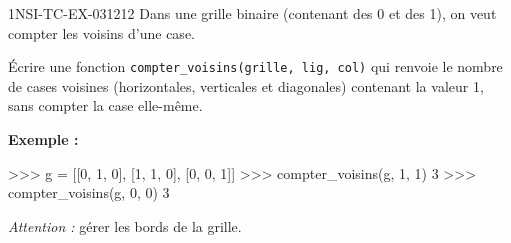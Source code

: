 \begin{exercice}{1NSI-TC-EX-031}{2}{12}
Dans une grille binaire (contenant des 0 et des 1), on veut compter les voisins
d'une case.

Écrire une fonction \lstinline{compter_voisins(grille, lig, col)} qui renvoie le
nombre de cases voisines (horizontales, verticales et diagonales) contenant la
valeur 1, sans compter la case elle-même.

\textbf{Exemple :}
\begin{console}
>>> g = [[0, 1, 0], [1, 1, 0], [0, 0, 1]]
>>> compter_voisins(g, 1, 1)
3
>>> compter_voisins(g, 0, 0)
3
\end{console}

\textit{Attention :} gérer les bords de la grille.
\end{exercice}
